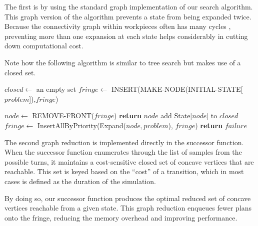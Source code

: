 The first is by using the standard graph implementation of our search algorithm. This graph version of the algorithm prevents a state from being expanded twice. Because the connectivity graph within workpieces often has many cycles \cite{Yasui2011}, preventing more than one expansion at each state helps considerably in cutting down computational cost.

Note how the following algorithm is similar to tree search but makes use of a closed set.

\begin{algorithm}[H]
\begin{algorithmic}[1]
	\State $closed \gets$ an empty set
	\State $fringe \gets$ INSERT(MAKE-NODE(INITIAL-STATE[$problem$]),$fringe$)

		\State $node \gets$ REMOVE-FRONT($fringe$)
			\State \textbf{return} $node$ 
		\EndIf
			\State add State[$node$] to $closed$
			\State $fringe \gets$ InsertAllByPriority(Expand($node, problem$), $fringe$)
		\EndIf
	\EndWhile
	\State \textbf{return} $failure$ 

\EndFunction

\end{algorithmic}
\end{algorithm}

The second graph reduction is implemented directly in the successor function. When the successor function enumerates through the list of samples from the possible turns, it maintains a cost-sensitive closed set of concave vertices that are reachable. This set is keyed based on the ``cost'' of a transition, which in most cases is defined as the duration of the simulation.

By doing so, our successor function produces the optimal reduced set of concave vertices reachable from a given state. This graph reduction enqueues fewer plans onto the fringe, reducing the memory overhead and improving performance.



